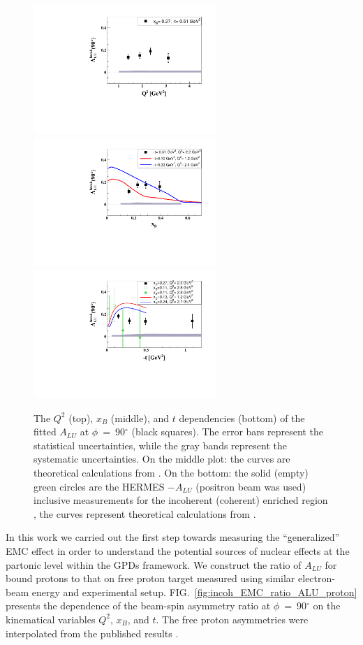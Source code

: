 \documentclass[twocolumn,nofootinbib,showpacs,prl,superscriptaddress,secnumarabic,amssymb,nobibnotes,aps,floatfix]{revtex4}
\begin{document}
\begin{figure}[tb]
\includegraphics[width=6.9cm]{figs/ALU_90_p_vs_Q2_shortscenrario.pdf}
\includegraphics[width=6.9cm]{figs/ALU_90_p_vs_x_shortscenrario.pdf}
\includegraphics[width=6.9cm]{figs/ALU_90_p_vs_t_shortscenrario.pdf}
\caption{The $Q^{2}$ (top), $x_{B}$ (middle), and $t$ dependencies (bottom) of
   the fitted $A_{LU}$ at $\phi$~=~90$^{\circ}$ (black squares). The error bars 
   represent the statistical uncertainties, while the gray bands represent the 
   systematic uncertainties. On the middle plot: the curves are theoretical 
   calculations from \cite{simonetta_2}. On the bottom: the solid (empty) green 
   circles are the HERMES $-A_{LU}$ (positron beam was used) inclusive 
measurements for the incoherent (coherent) enriched region 
\cite{Airapetian:2009cga}, the curves represent theoretical calculations from 
\cite{simonetta_2}.  } \label{fig:alu90}
\end{figure}

In this work we carried out the first step towards measuring the 
``generalized'' EMC effect in order to understand the potential sources of 
nuclear effects at the partonic level within the GPDs framework. We construct 
the ratio of $A_{LU}$ for bound protons to that on free proton target measured 
using similar electron-beam energy and experimental setup.  
FIG.~\ref{fig:incoh_EMC_ratio_ALU_proton} presents the dependence of the 
beam-spin asymmetry ratio at $\phi$~=~90$^{\circ}$ on the kinematical variables 
$Q^2$, $x_B$, and $t$. The free proton asymmetries were interpolated from the 
published results \cite{Girod:2007aa}.   
\end{document}

